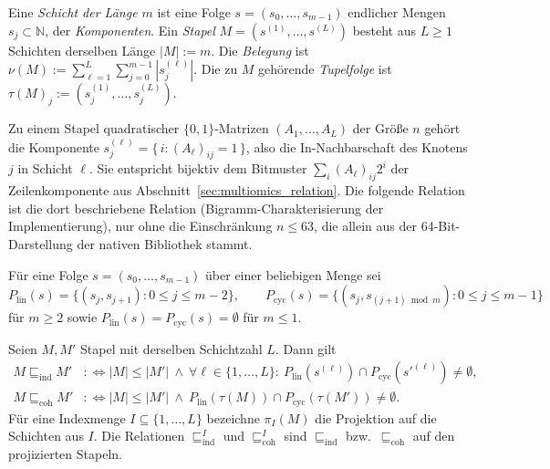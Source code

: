 \begin{definition}
	Eine \emph{Schicht der Länge $m$} ist eine Folge $s=(s_0,\dots,s_{m-1})$ endlicher Mengen $s_j\subset\mathbb{N}$, der \emph{Komponenten}. Ein \emph{Stapel} $M=(s^{(1)},\dots,s^{(L)})$ besteht aus $L\ge 1$ Schichten derselben Länge $|M|:=m$. Die \emph{Belegung} ist $\nu(M):=\sum_{\ell=1}^{L}\sum_{j=0}^{m-1}|s^{(\ell)}_j|$. Die zu $M$ gehörende \emph{Tupelfolge} ist $\tau(M)_j:=(s^{(1)}_j,\dots,s^{(L)}_j)$.
\end{definition}

\begin{bemerkung}
	\label{bem:univ_matrix}
	Zu einem Stapel quadratischer $\{0,1\}$-Matrizen $(A_1,\dots,A_L)$ der Größe $n$ gehört die Komponente $s^{(\ell)}_j=\{\,i : (A_\ell)_{ij}=1\,\}$, also die In-Nachbarschaft des Knotens $j$ in Schicht $\ell$. Sie entspricht bijektiv dem Bitmuster $\sum_i (A_\ell)_{ij}2^i$ der Zeilenkomponente aus Abschnitt~\ref{sec:multiomics_relation}. Die folgende Relation ist die dort beschriebene Relation (Bigramm-Charakterisierung der Implementierung), nur ohne die Einschränkung $n\le 63$, die allein aus der 64-Bit-Darstellung der nativen Bibliothek stammt.
\end{bemerkung}

\begin{definition}[Paarmengen]
	Für eine Folge $s=(s_0,\dots,s_{m-1})$ über einer beliebigen Menge sei
	\[
	P_{\mathrm{lin}}(s)=\{(s_j,s_{j+1}) : 0\le j\le m-2\},\qquad
	P_{\mathrm{cyc}}(s)=\{(s_j,s_{(j+1)\bmod m}) : 0\le j\le m-1\}
	\]
	für $m\ge 2$ sowie $P_{\mathrm{lin}}(s)=P_{\mathrm{cyc}}(s)=\emptyset$ für $m\le 1$.
\end{definition}

\begin{definition}[Enthaltensein]
	Seien $M,M'$ Stapel mit derselben Schichtzahl $L$. Dann gilt
	\begin{align*}
	M\sqsubseteq_{\mathrm{ind}}M' &:\iff |M|\le|M'| \ \wedge\ \forall \ell\in\{1,\dots,L\}:\ P_{\mathrm{lin}}(s^{(\ell)})\cap P_{\mathrm{cyc}}(s'^{(\ell)})\neq\emptyset,\\
	M\sqsubseteq_{\mathrm{coh}}M' &:\iff |M|\le|M'| \ \wedge\ P_{\mathrm{lin}}(\tau(M))\cap P_{\mathrm{cyc}}(\tau(M'))\neq\emptyset.
	\end{align*}
	Für eine Indexmenge $I\subseteq\{1,\dots,L\}$ bezeichne $\pi_I(M)$ die Projektion auf die Schichten aus $I$. Die Relationen $\sqsubseteq_{\mathrm{ind}}^{I}$ und $\sqsubseteq_{\mathrm{coh}}^{I}$ sind $\sqsubseteq_{\mathrm{ind}}$ bzw.\ $\sqsubseteq_{\mathrm{coh}}$ auf den projizierten Stapeln.
\end{definition}

